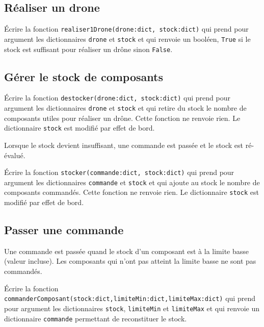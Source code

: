 \documentclass[t,10pt]{article}
\begin{document}
\subsection*{Réaliser un drone}
\setcounter{cexo}{0}

\begin{qexo}
\'Ecrire la fonction \texttt{realiser1Drone(drone:dict, stock:dict)} qui prend pour argument les dictionnaires \texttt{drone} et \texttt{stock} et qui renvoie un booléen, \texttt{True} si le stock est suffisant pour réaliser un drône sinon \texttt{False}.
\end{qexo}

\subsection*{Gérer le stock de composants}

\begin{qexo}
\'Ecrire la fonction \texttt{destocker(drone:dict, stock:dict)} qui prend pour argument les dictionnaires \texttt{drone} et \texttt{stock} et qui retire du stock le nombre de composants utiles pour réaliser un drône. Cette fonction ne renvoie rien. Le dictionnaire \texttt{stock} est modifié par effet de bord.
\end{qexo}

Lorsque le stock devient insuffisant, une commande est passée et le stock est ré-évalué.

\begin{qexo}
\'Ecrire la fonction \texttt{stocker(commande:dict, stock:dict)} qui prend pour argument les dictionnaires \texttt{commande} et \texttt{stock} et qui ajoute au stock le nombre de composants commandés. Cette fonction ne renvoie rien. Le dictionnaire \texttt{stock} est modifié par effet de bord.
\end{qexo}

\subsection*{Passer une commande}
Une commande est passée quand le stock d'un composant est à la limite basse (valeur incluse). Les composants qui n'ont pas atteint la limite basse ne sont pas commandés.

\begin{qexo}
\'Ecrire la fonction \texttt{commanderComposant(stock:dict,limiteMin:dict,limiteMax:dict)} qui prend pour argument les dictionnaires \texttt{stock}, \texttt{limiteMin} et \texttt{limiteMax} et qui renvoie un dictionnaire \texttt{commande} permettant de reconstituer le stock.
\end{qexo}
\end{document}
